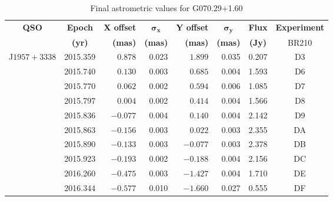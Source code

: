 	\begin{table}[h]
		\onehalfspacing
		\footnotesize
		\centering
		\caption{Final astrometric values for G070.29$+$1.60}
		\label{tab:g070_position}
		\begin{tabular}{lrrrrrrc} \toprule
			\multicolumn{1}{c}{\bf QSO}&\multicolumn{1}{c}{\bf Epoch} & \multicolumn{1}{c}{\bf X offset} & \multicolumn{1}{c}{$\boldsymbol{\sigma_x}$} & \multicolumn{1}{c}{\bf Y offset} & \multicolumn{1}{c}{$\boldsymbol{\sigma_y}$} & \multicolumn{1}{c}{\bf Flux} & \multicolumn{1}{c}{\bf Experiment} \\
			\multicolumn{1}{c}{}&\multicolumn{1}{c}{\bf (yr)} & \multicolumn{1}{r}{\bf (mas)} & \multicolumn{1}{r}{\bf (mas)} & \multicolumn{1}{r}{\bf (mas)} & \multicolumn{1}{c}{\bf (mas)} & \multicolumn{1}{c}{\bf (Jy)} & \multicolumn{1}{c}{BR210} \\ \midrule        
			J$1957+3338$
						&2015.359  & $ 0.878$  &  0.023  & $ 1.899$  &  0.035 & 0.207 & D3 \\
						&2015.740  & $ 0.130$  &  0.003  & $ 0.685$  &  0.004 & 1.593 & D6 \\
						&2015.770  & $ 0.062$  &  0.002  & $ 0.594$  &  0.006 & 1.085 & D7 \\
						&2015.797  & $ 0.004$  &  0.002  & $ 0.414$  &  0.004 & 1.566 & D8 \\
						&2015.836  & $-0.077$  &  0.004  & $ 0.140$  &  0.004 & 2.142 & D9 \\
						&2015.863  & $-0.156$  &  0.003  & $ 0.022$  &  0.003 & 2.355 & DA \\
						&2015.890  & $-0.133$  &  0.003  & $-0.077$  &  0.003 & 2.378 & DB \\
						&2015.923  & $-0.193$  &  0.002  & $-0.188$  &  0.004 & 2.156 & DC \\
						&2016.260  & $-0.475$  &  0.003  & $-1.427$  &  0.004 & 1.710 & DE \\
						&2016.344  & $-0.577$  &  0.010  & $-1.660$  &  0.027 & 0.555 & DF \\

\end{tabular}
\end{table}
